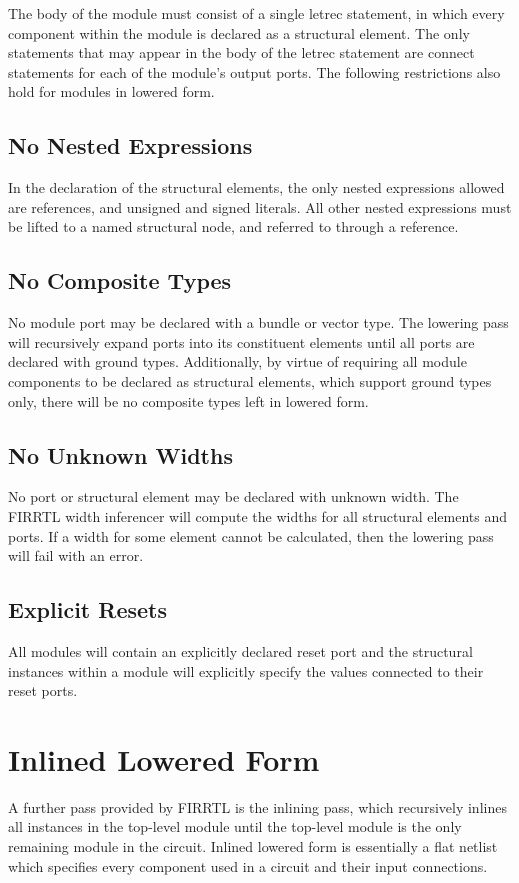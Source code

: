 \documentclass[12pt]{article}
\begin{document}
The body of the module must consist of a single letrec statement, in which every component within the module is declared as a structural element. The only statements that may appear in the body of the letrec statement are connect statements for each of the module's output ports. The following restrictions also hold for modules in lowered form.

\subsection{No Nested Expressions}
In the declaration of the structural elements, the only nested expressions allowed are references, and unsigned and signed literals. All other nested expressions must be lifted to a named structural node, and referred to through a reference. 

\subsection{No Composite Types}
No module port may be declared with a bundle or vector type. The lowering pass will recursively expand ports into its constituent elements until all ports are declared with ground types. Additionally, by virtue of requiring all module components to be declared as structural elements, which support ground types only, there will be no composite types left in lowered form.

\subsection{No Unknown Widths}
No port or structural element may be declared with unknown width. The FIRRTL width inferencer will compute the widths for all structural elements and ports. If a width for some element cannot be calculated, then the lowering pass will fail with an error.

\subsection{Explicit Resets}
All modules will contain an explicitly declared reset port and the structural instances within a module will explicitly specify the values connected to their reset ports.


\section{Inlined Lowered Form}
A further pass provided by FIRRTL is the inlining pass, which recursively inlines all instances in the top-level module until the top-level module is the only remaining module in the circuit. Inlined lowered form is essentially a flat netlist which specifies every component used in a circuit and their input connections. 
\end{document}
